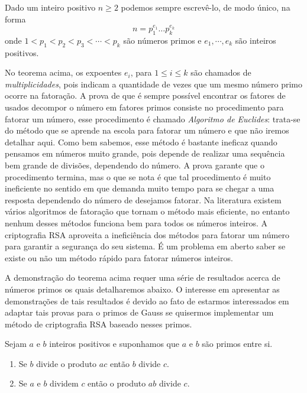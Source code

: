 \begin{Th}
\label{fat.unica} 
Dado um inteiro positivo $n\geq 2$ podemos sempre escrev\^e-lo, de modo \'unico, na forma
$$n=p_{1}^{e_1}\dots p_{k}^{e_k}$$
onde $1<p_1<p_2<p_3<\cdots<p_k$ s\~ao n\'umeros primos e $e_1, \cdots, e_k$ s\~ao inteiros positivos.
\end{Th}

No teorema acima, os expoentes $e_i$, para $1\leq i\leq k$ s\~ao chamados de \textit{multiplicidades}, pois indicam a quantidade de vezes que um mesmo n\'umero primo ocorre na fatora\c{c}\~ao. A prova de que \'e sempre poss\'ivel encontrar os fatores de usados decompor o n\'umero em fatores primos consiste no procedimento para fatorar um n\'umero, esse procedimento \'e chamado \textit{Algoritmo de Euclides}: trata-se do m\'etodo que se aprende na escola para fatorar
um n\'umero e que n\~ao iremos detalhar aqui. Como bem sabemos, esse m\'etodo \'e bastante ineficaz quando pensamos em n\'umeros muito grande, pois depende de realizar uma sequ\^encia bem grande de divis\~oes, dependendo do n\'umero. A prova garante que o procedimento termina, mas o que se nota \'e que tal procedimento \'e muito ineficiente no sentido em que demanda muito tempo para se chegar a uma resposta dependendo do n\'umero de desejamos fatorar. Na literatura existem v\'arios algoritmos de fatora\c{c}\~ao que tornam o m\'etodo mais eficiente, no entanto nenhum desses m\'etodos funciona bem para todos os n\'umeros inteiros. A criptografia RSA aproveita a inefici\^encia dos m\'etodos para fatorar um n\'umero para garantir a seguran\c{c}a do seu sistema. \'E um problema em aberto saber se existe ou n\~ao um m\'etodo r\'apido para fatorar n\'umeros inteiros.  

A demonstra\c{c}\~ao do teorema acima requer uma s\'erie de resultados acerca de n\'umeros primos os quais detalharemos abaixo. O interesse em apresentar as demonstra\c{c}\~oes de tais resultados \'e devido ao fato de estarmos interessados em adaptar tais provas para o primos de Gauss se quisermos implementar um m\'etodo de criptografia RSA baseado nesses primos. 

\begin{Th}\label{propriedade_de_primos}
Sejam $a$ e $b$ inteiros positivos e suponhamos que $a$ e $b$ s\~ao primos entre si.
\begin{enumerate}
\item Se $b$ divide o produto $ac$ ent\~ao $b$ divide $c$.
\item Se $a$ e $b$ dividem $c$ ent\~ao o produto $ab$ divide $c$.
\end{enumerate}
\end{Th}

